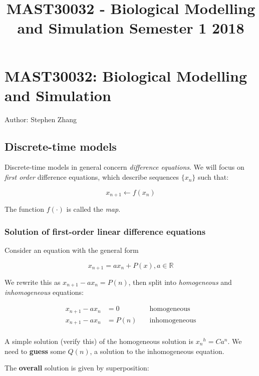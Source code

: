 \documentclass[11pt]{article}
\title{MAST30032 - Biological Modelling and Simulation Semester 1 2018}
\begin{document}
    
    
    \maketitle
    
    

    
    \section{MAST30032: Biological Modelling and
Simulation}\label{mast30032-biological-modelling-and-simulation}

Author: Stephen Zhang

    \subsection{Discrete-time models}\label{discrete-time-models}

Discrete-time models in general concern \emph{difference equations}. We
will focus on \emph{first order} difference equations, which describe
sequences \(\{x_n\}\) such that:

\[x_{n+1} \leftarrow f(x_n)\]

The function \(f(\cdot)\) is called the \emph{map}.

\subsubsection{Solution of first-order linear difference
equations}\label{solution-of-first-order-linear-difference-equations}

Consider an equation with the general form

\[x_{n+1} = ax_n + P(x), a \in \mathbb{R}\]

We rewrite this as \(x_{n+1} - ax_n = P(n)\), then split into
\emph{homogeneous} and \emph{inhomogeneous} equations:

\begin{align}
    x_{n+1} - ax_n &= 0 \quad &\text{homogeneous}\\
    x_{n+1} - ax_n &= P(n) \quad &\text{inhomogeneous}\\
\end{align}

A simple solution (verify this) of the homogeneous solution is
\({x_n}^h = Ca^n\). We need to \textbf{guess} some \(Q(n)\), a solution
to the inhomogeneous equation.

The \textbf{overall} solution is given by superposition:
\end{document}
